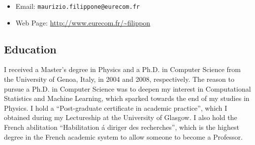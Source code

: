 \documentclass[oneside, a4paper, onecolumn, 10pt]{article}
\title{\mytitle}
\author{Maurizio Filippone} %
\newcommand{\mytitle}[0]{CURRICULUM VITAE}
\begin{document}
\begin{center}
  {\Large {\color{MidnightBlue}{\bf \mytitle}}\par}
\end{center}

\begin{center}
  {{\color{MidnightBlue}{\bf Maurizio Filippone}}\par}
\end{center}


\linespread{0.9}
\selectfont

\begin{itemize}
\item Email:              \texttt{maurizio.filippone@eurecom.fr}
\item Web Page:           \url{http://www.eurecom.fr/~filippon}
\end{itemize}



\subsection*{Education}

I received a Master's degree in Physics and a Ph.D. in Computer Science from the University of Genoa, Italy, in 2004 and 2008, respectively.
The reason to pursue a Ph.D. in Computer Science was to deepen my interest in Computational Statistics and Machine Learning, which sparked towards the end of my studies in Physics.
I hold a ``Post-graduate certificate in academic practice'', which I obtained during my Lectureship at the University of Glasgow.
I also hold the French abilitation ``Habilitation \'a diriger des recherches'', which is the highest degree in the French academic system to allow someone to become a Professor.


\end{document}
